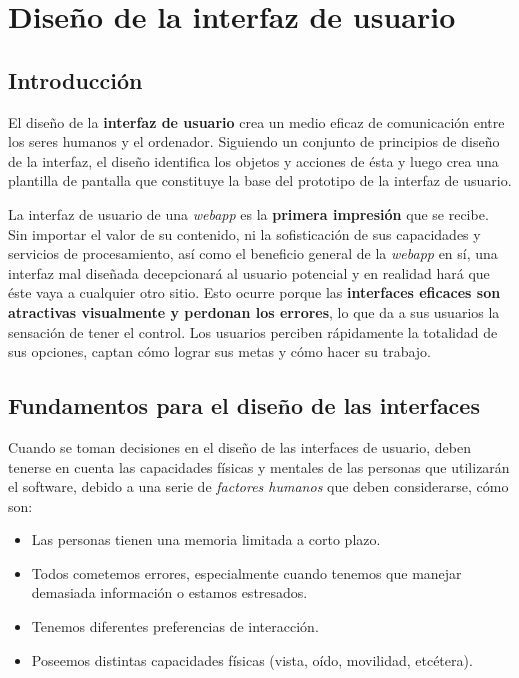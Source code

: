 

	\section{Diseño de la interfaz de usuario} %
	\label{sec:interfaz_usuario}
	
	\subsection{Introducción} %
		\label{sub:iu_introduccion}
	
	El diseño de la \textbf{interfaz de usuario} crea un medio eficaz de comunicación entre los seres humanos y el ordenador. Siguiendo un conjunto de principios de diseño de la interfaz, el diseño identifica los objetos y acciones de ésta y luego crea una plantilla de pantalla que constituye la base del prototipo de la interfaz de usuario.
	
	La interfaz de usuario de una \textit{webapp} es la \textbf{primera impresión} que se recibe. Sin importar el valor de su contenido, ni la sofisticación de sus capacidades y servicios de procesamiento, así como el beneficio general de la \textit{webapp} en sí, una interfaz mal diseñada decepcionará al usuario potencial y en realidad hará que éste vaya a cualquier otro sitio. Esto ocurre porque las \textbf{interfaces eficaces son atractivas visualmente y perdonan los errores}, lo que da a sus usuarios la sensación de tener el control. Los usuarios perciben rápidamente la totalidad de sus opciones, captan cómo lograr sus metas y cómo hacer su trabajo.
	
	
	\subsection{Fundamentos para el diseño de las interfaces} %
	\label{sub:iu_fundamentos}
	
	Cuando se toman decisiones en el diseño de las interfaces de usuario, deben tenerse en cuenta las capacidades físicas y mentales de las personas que utilizarán el software, debido a una serie de \textit{factores humanos} que deben considerarse, cómo son:
	\begin{itemize}
		\item Las personas tienen una memoria limitada a corto plazo.
		\item Todos cometemos errores, especialmente cuando tenemos que manejar demasiada información o estamos estresados.
		\item Tenemos diferentes preferencias de interacción.
		\item Poseemos distintas capacidades físicas (vista, oído, movilidad, etcétera).
	\end{itemize}

